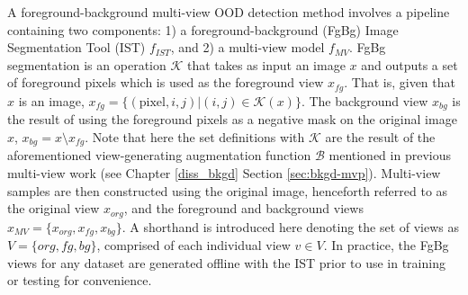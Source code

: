 A foreground-background multi-view OOD detection method involves a pipeline containing two components: 1) a foreground-background (FgBg) Image Segmentation Tool (IST) $f_{IST}$, and 2) a multi-view model $f_{MV}$. FgBg segmentation is an operation $\mathcal{K}$ that takes as input an image $x$ and outputs a set of foreground pixels which is used as the foreground view $x_{fg}$. That is, given that $x$ is an image, $x_{fg} = \{(\text{pixel},i,j) | (i,j) \in \mathcal{K}(x)\}$. The background view $x_{bg}$ is the result of using the foreground pixels as a negative mask on the original image $x$, $x_{bg} = x \setminus x_{fg}$. Note that here the set definitions with $\mathcal{K}$ are the result of the aforementioned view-generating augmentation function $\mathcal{B}$ mentioned in previous multi-view work (see Chapter \ref{diss_bkgd} Section \ref{sec:bkgd-mvp}). Multi-view samples are then constructed using the original image, henceforth referred to as the original view $x_{org}$, and the foreground and background views $x_{MV} = \{x_{org}, x_{fg}, x_{bg}\}$. A shorthand is introduced here denoting the set of views as $V = \{org, fg, bg\}$, comprised of each individual view $v\in V$. In practice, the FgBg views for any dataset are generated offline with the IST prior to use in training or testing for convenience. %

